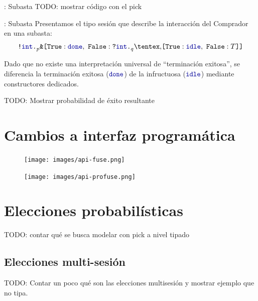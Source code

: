\begin{frame}{\insertsection: Subasta}
	TODO: mostrar código con el pick
\end{frame}

\begin{frame}{\insertsection: Subasta}
	Presentamos el tipo sesión que describe la interacción del Comprador en una subasta:
	\begin{equation*}
	    \label{eq:refined.auction}
	    \Out\tint{
		\BinaryPBranch[p]\Done{
		    \In\tint{
			\BinaryPChoice[q]\Idle\T
		    }
		}
	    }
	\end{equation*}

	Dado que no existe una interpretación universal de ``terminación
	exitosa'', se diferencia la terminación exitosa ($\Done$) de la
	infructuosa ($\Idle$) mediante constructores dedicados.

	TODO: Mostrar probabilidad de éxito resultante
\end{frame}

\section{Cambios a interfaz programática}

\begin{frame}{\insertsection}
	\begin{figure}
		\centering
		\texttt{[image: images/api-fuse.png]}
	\end{figure}
	\begin{figure}
		\centering
		\texttt{[image: images/api-profuse.png]}
	\end{figure}
\end{frame}

\section{Elecciones probabilísticas}

\begin{frame}{\insertsection}
	TODO: contar qué se busca modelar con pick a nivel tipado
\end{frame}

\subsection{Elecciones multi-sesión}

\begin{frame}{\insertsubsection}
	TODO: Contar un poco qué son las elecciones multisesión y mostrar ejemplo que no tipa.
\end{frame}

